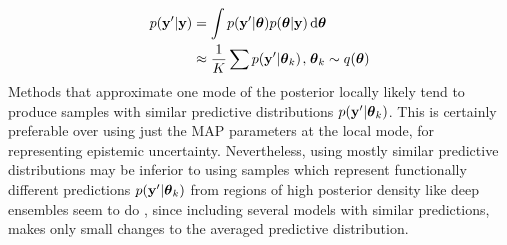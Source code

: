 \documentclass[../thesis.tex]{subfiles}
\begin{document}
\begin{equation}
    \begin{split}
        p(\boldsymbol{\mathbf{y}}' | \boldsymbol{\mathbf{y}}) &= \int p(\boldsymbol{\mathbf{y}}' | \boldsymbol{\mathbf{\theta}}) p(\boldsymbol{\mathbf{\theta}} | \boldsymbol{\mathbf{y}}) \mathop{}\!\mathrm{d}\boldsymbol{\mathbf{\theta}} \\
        &\approx \frac{1}{K} \sum p(\boldsymbol{\mathbf{y}}' | \boldsymbol{\mathbf{\theta}}_k) \hspace{0.1em}, \hspace{0.1em} \boldsymbol{\mathbf{\theta}}_k \sim q(\boldsymbol{\mathbf{\theta}})
    \end{split}
\end{equation}
Methods that approximate one mode of the posterior locally likely tend to produce samples with similar predictive distributions $p(\boldsymbol{\mathbf{y}}' | \boldsymbol{\mathbf{\theta}}_k)$. This is certainly preferable over using just the MAP parameters at the local mode, for representing epistemic uncertainty. Nevertheless, using mostly similar predictive distributions may be inferior to using samples which represent functionally different predictions $p(\boldsymbol{\mathbf{y}}' | \boldsymbol{\mathbf{\theta}}_k)$ from regions of high posterior density like deep ensembles seem to do \parencite{wilson2020bayesian}, since including several models with similar predictions, makes only small changes to the averaged predictive distribution.
\end{document}
